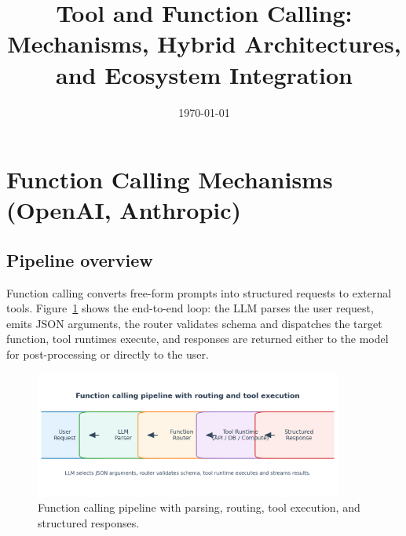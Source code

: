 \documentclass{article}
\title{Tool and Function Calling: Mechanisms, Hybrid Architectures, and Ecosystem Integration}
\author{}
\date{\today}
\begin{document}
\maketitle

\section{Function Calling Mechanisms (OpenAI, Anthropic)}
\subsection{Pipeline overview}
Function calling converts free-form prompts into structured requests to external tools. Figure~\ref{fig:function_pipeline_en} shows the end-to-end loop: the LLM parses the user request, emits JSON arguments, the router validates schema and dispatches the target function, tool runtimes execute, and responses are returned either to the model for post-processing or directly to the user.
\begin{figure}[H]
  \centering
  \includegraphics[width=0.9\textwidth]{function_calling_pipeline.png}
  \caption{Function calling pipeline with parsing, routing, tool execution, and structured responses.}
  \label{fig:function_pipeline_en}
\end{figure}
\end{document}
